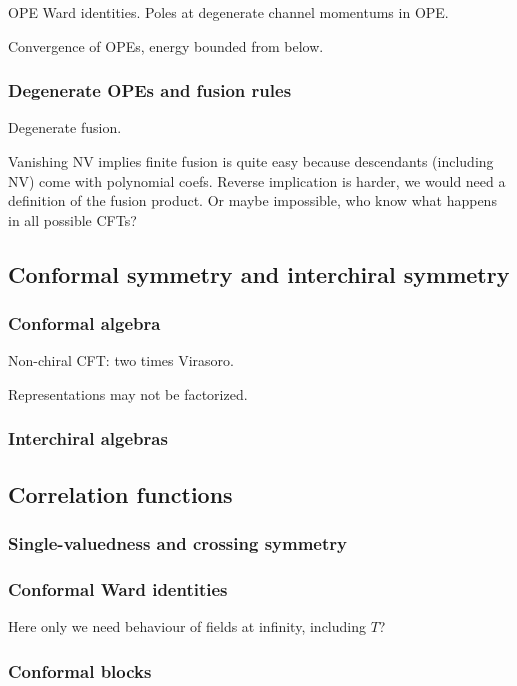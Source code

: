 \documentclass[12pt, a4paper]{article}
\theoremstyle{break}
\begin{document}
OPE Ward identities. Poles at degenerate channel momentums in OPE. 

Convergence of OPEs, energy bounded from below.

\subsubsection{Degenerate OPEs and fusion rules}\label{sec:dope}

Degenerate fusion. 

Vanishing NV implies finite fusion is quite easy because descendants (including NV) come with polynomial coefs. Reverse implication is harder, we would need a definition of the fusion product. Or maybe impossible, who know what happens in all possible CFTs? 

\subsection{Conformal symmetry and interchiral symmetry}

\subsubsection{Conformal algebra}

Non-chiral CFT: two times Virasoro.

Representations may not be factorized.

\subsubsection{Interchiral algebras}

\subsection{Correlation functions}\label{sec:cor}

\subsubsection{Single-valuedness and crossing symmetry}

\subsubsection{Conformal Ward identities}

Here only we need behaviour of fields at infinity, including $T$?

\subsubsection{Conformal blocks}
\end{document}
